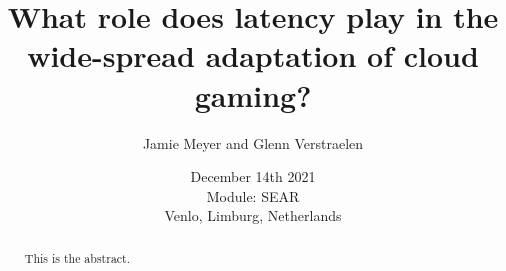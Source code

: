 \documentclass[]{report}
\title{What role does latency play in the wide-spread adaptation of cloud gaming?}
\author{Jamie Meyer and Glenn Verstraelen}
\date{December 14th 2021 \\Module: SEAR \\Venlo, Limburg, Netherlands}
\begin{document}
\maketitle

\begin{abstract}
This is the abstract.
\end{abstract}

\tableofcontents
\setcounter{page}{3}
\pagebreak
{}	
	
 
 
 
 
\end{document}

